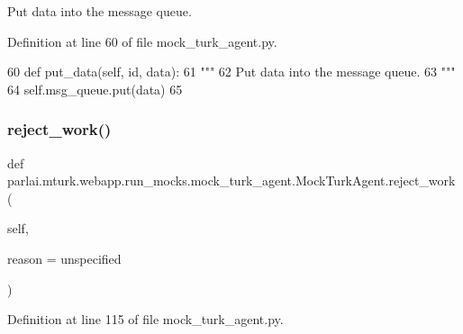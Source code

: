 \begin{DoxyVerb}Put data into the message queue.
\end{DoxyVerb}
 

Definition at line 60 of file mock\+\_\+turk\+\_\+agent.\+py.


\begin{DoxyCode}
60     \textcolor{keyword}{def }put\_data(self, id, data):
61         \textcolor{stringliteral}{"""}
62 \textcolor{stringliteral}{        Put data into the message queue.}
63 \textcolor{stringliteral}{        """}
64         self.msg\_queue.put(data)
65 
\end{DoxyCode}
\mbox{\label{classparlai_1_1mturk_1_1webapp_1_1run__mocks_1_1mock__turk__agent_1_1MockTurkAgent_a00eb96454a9ff0c5047ad925fd687c06}} 
\subsubsection{\texorpdfstring{reject\+\_\+work()}{reject\_work()}}
{\footnotesize\ttfamily def parlai.\+mturk.\+webapp.\+run\+\_\+mocks.\+mock\+\_\+turk\+\_\+agent.\+Mock\+Turk\+Agent.\+reject\+\_\+work (\begin{DoxyParamCaption}\item[{}]{self,  }\item[{}]{reason = {\ttfamily \textquotesingle{}unspecified\textquotesingle{}} }\end{DoxyParamCaption})}



Definition at line 115 of file mock\+\_\+turk\+\_\+agent.\+py.


